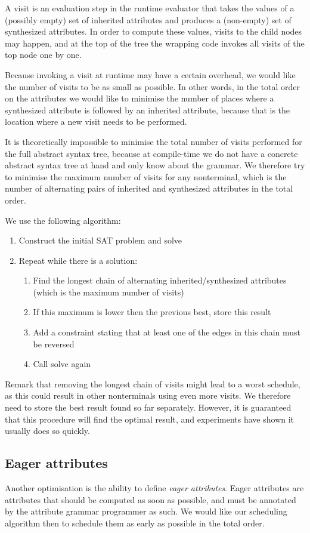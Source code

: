 \documentclass{llncs}
\begin{document}
A visit is an evaluation step in the runtime evaluator that takes the values of a (possibly empty) set of inherited attributes and produces a (non-empty) set of synthesized attributes. In order to compute these values, visits to the child nodes may happen, and at the top of the tree the wrapping code invokes all visits of the top node one by one.

Because invoking a visit at runtime may have a certain overhead, we would like the number of visits to be as small as possible. In other words, in the total order on the attributes we would like to minimise the number of places where a synthesized attribute is followed by an inherited attribute, because that is the location where a new visit needs to be performed.

It is theoretically impossible to minimise the total number of visits performed for the full abstract syntax tree, because at compile-time we do not have a concrete abstract syntax tree at hand and only know about the grammar. We therefore try to minimise the maximum number of visits for any nonterminal, which is the number of alternating pairs of inherited and synthesized attributes in the total order.

We use the following algorithm:
\begin{enumerate}
\item Construct the initial SAT problem and solve
\item Repeat while there is a solution:
\begin{enumerate}
\item Find the longest chain of alternating inherited/synthesized attributes (which is the maximum number of visits)
\item If this maximum is lower then the previous best, store this result
\item Add a constraint stating that at least one of the edges in this chain must be reversed
\item Call solve again
\end{enumerate}
\end{enumerate}

Remark that removing the longest chain of visits might lead to a worst schedule, as this could result in other nonterminals using even more visits. We therefore need to store the best result found so far separately. However, it is guaranteed that this procedure will find the optimal result, and experiments have shown it usually does so quickly.

\subsection{Eager attributes} \label{sect:eagerattributes}
Another optimisation is the ability to define \emph{eager attributes}. Eager attributes are attributes that should be computed as soon as possible, and must be annotated by the attribute grammar programmer as such. We would like our scheduling algorithm then to schedule them as early as possible in the total order.
\end{document}
